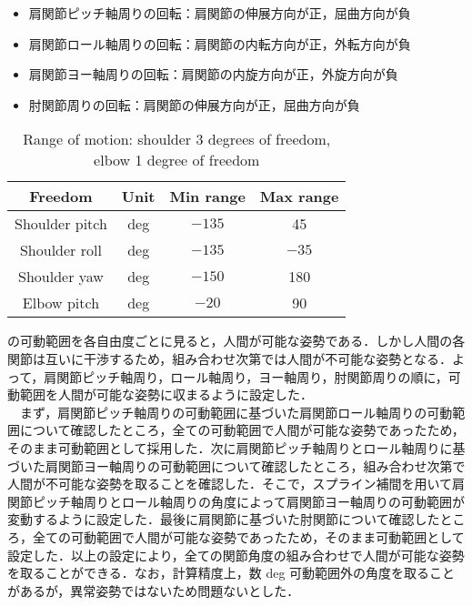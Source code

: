 \begin{itemize}
  \item 肩関節ピッチ軸周りの回転：肩関節の伸展方向が正，屈曲方向が負
  \item 肩関節ロール軸周りの回転：肩関節の内転方向が正，外転方向が負
  \item 肩関節ヨー軸周りの回転：肩関節の内旋方向が正，外旋方向が負
  \item 肘関節周りの回転：肩関節の伸展方向が正，屈曲方向が負
\end{itemize}


\begin{table}[tb]
  \begin{center}
    \caption{Range of motion: shoulder 3 degrees of freedom, elbow 1 degree of freedom}
    \begin{tabular}{c|c|c|c}
      \hline
      Freedom & Unit & Min range & Max range \\
      \hline
      Shoulder pitch & deg & $-135$ & 45 \\
      Shoulder roll & deg & $-135$ & $-35$ \\
      Shoulder yaw & deg & $-150$ & 180 \\
      Elbow pitch & deg & $-20$ & 90 \\
      \hline
    \end{tabular}
  \end{center}
\end{table}

の可動範囲を各自由度ごとに見ると，人間が可能な姿勢である．しかし人間の各関節は互いに干渉するため，組み合わせ次第では人間が不可能な姿勢となる．よって，肩関節ピッチ軸周り，ロール軸周り，ヨー軸周り，肘関節周りの順に，可動範囲を人間が可能な姿勢に収まるように設定した．\\
　まず，肩関節ピッチ軸周りの可動範囲に基づいた肩関節ロール軸周りの可動範囲について確認したところ，全ての可動範囲で人間が可能な姿勢であったため，そのまま可動範囲として採用した．次に肩関節ピッチ軸周りとロール軸周りに基づいた肩関節ヨー軸周りの可動範囲について確認したところ，組み合わせ次第で人間が不可能な姿勢を取ることを確認した．そこで，スプライン補間\cite{spline}を用いて肩関節ピッチ軸周りとロール軸周りの角度によって肩関節ヨー軸周りの可動範囲が変動するように設定した．最後に肩関節に基づいた肘関節について確認したところ，全ての可動範囲で人間が可能な姿勢であったため，そのまま可動範囲として設定した．以上の設定により，全ての関節角度の組み合わせで人間が可能な姿勢を取ることができる．なお，計算精度上，数 deg 可動範囲外の角度を取ることがあるが，異常姿勢ではないため問題ないとした．


